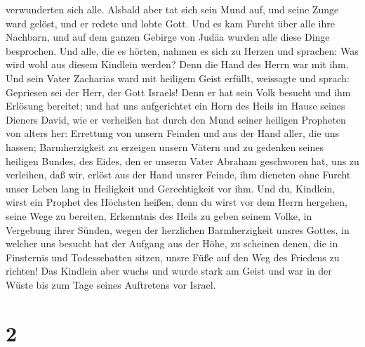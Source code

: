 verwunderten sich alle.  Alsbald aber tat sich sein Mund
auf, und seine Zunge ward gelöst, und er redete und lobte Gott.
 Und es kam Furcht über alle ihre Nachbarn, und auf dem
ganzen Gebirge von Judäa wurden alle diese Dinge besprochen.
 Und alle, die es hörten, nahmen es sich zu Herzen und
sprachen: Was wird wohl aus diesem Kindlein werden? Denn die Hand des
Herrn war mit ihm.  Und sein Vater Zacharias ward mit
heiligem Geist erfüllt, weissagte und sprach:  Gepriesen
sei der Herr, der Gott Israels! Denn er hat sein Volk besucht und ihm
Erlösung bereitet;  und hat uns aufgerichtet ein Horn des
Heils im Hause seines Dieners David,  wie er verheißen
hat durch den Mund seiner heiligen Propheten von alters her:
 Errettung von unsern Feinden und aus der Hand aller, die
uns hassen;  Barmherzigkeit zu erzeigen unsern Vätern und
zu gedenken seines heiligen Bundes,  des Eides, den er
unserm Vater Abraham geschworen hat, uns zu verleihen, 
daß wir, erlöst aus der Hand unsrer Feinde, ihm dieneten ohne Furcht
unser Leben lang  in Heiligkeit und Gerechtigkeit vor
ihm.  Und du, Kindlein, wirst ein Prophet des Höchsten
heißen, denn du wirst vor dem Herrn hergehen, seine Wege zu bereiten,
 Erkenntnis des Heils zu geben seinem Volke, in Vergebung
ihrer Sünden,  wegen der herzlichen Barmherzigkeit unsres
Gottes, in welcher uns besucht hat der Aufgang aus der Höhe,
 zu scheinen denen, die in Finsternis und Todesschatten
sitzen, unsre Füße auf den Weg des Friedens zu richten! 
Das Kindlein aber wuchs und wurde stark am Geist und war in der Wüste
bis zum Tage seines Auftretens vor Israel.

\hypertarget{section-1}{%
\section{2}\label{section-1}}

